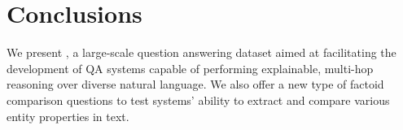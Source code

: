 \section{Conclusions}

We present \datasetname{}, a large-scale question answering dataset aimed at facilitating the development of QA systems capable of performing explainable, multi-hop reasoning over diverse natural language. We also offer a new type of factoid comparison questions to test systems' ability to extract and compare various entity properties in text.
